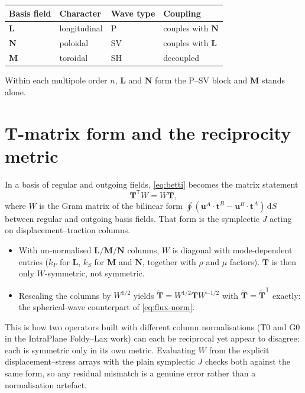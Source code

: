 \documentclass[11pt,a4paper]{article}
\newcommand{\dd}{\mathrm{d}}
\newcommand{\bT}{\mathbf{T}}
\newcommand{\bu}{\mathbf{u}}
\newcommand{\bt}{\mathbf{t}}
\newcommand{\bL}{\mathbf{L}}
\newcommand{\bM}{\mathbf{M}}
\newcommand{\bN}{\mathbf{N}}
\begin{document}
\begin{center}
\begin{tabular}{llll}
\toprule
Basis field & Character & Wave type & Coupling \\
\midrule
$\bL$ & longitudinal & P  & couples with $\bN$ \\
$\bN$ & poloidal     & SV & couples with $\bL$ \\
$\bM$ & toroidal     & SH & decoupled \\
\bottomrule
\end{tabular}
\end{center}

\noindent Within each multipole order $n$, $\bL$ and $\bN$ form the
P--SV block and $\bM$ stands alone.

\section{T-matrix form and the reciprocity metric}
\label{sec:tmatrix}

In a basis of regular and outgoing fields, \eqref{eq:betti} becomes the
matrix statement \citep{Waterman1976,Pao1978}
\begin{equation}
  \bT^{\mathsf T} W = W \bT ,
  \label{eq:t-recip}
\end{equation}
where $W$ is the Gram matrix of the bilinear form
$\oint (\bu^A\cdot\bt^B - \bu^B\cdot\bt^A)\,\dd S$ between regular and
outgoing basis fields. That form is the symplectic $J$ acting on
displacement--traction columns.

\begin{itemize}
\item With un-normalised $\bL/\bM/\bN$ columns, $W$ is diagonal with
  mode-dependent entries ($k_P$ for $\bL$, $k_S$ for $\bM$ and $\bN$,
  together with $\rho$ and $\mu$ factors). $\bT$ is then only
  $W$-symmetric, not symmetric.
\item Rescaling the columns by $W^{1/2}$ yields
  $\tilde{\bT} = W^{1/2} \bT W^{-1/2}$ with
  $\tilde{\bT} = \tilde{\bT}^{\mathsf T}$ exactly: the spherical-wave
  counterpart of \eqref{eq:flux-norm}.
\end{itemize}

This is how two operators built with different column normalisations
(T0 and G0 in the IntraPlane Foldy--Lax work) can each be reciprocal yet
appear to disagree: each is symmetric only in its own metric.
Evaluating $W$ from the explicit displacement--stress arrays with the
plain symplectic $J$ checks both against the same form, so any residual
mismatch is a genuine error rather than a normalisation artefact.
\end{document}
